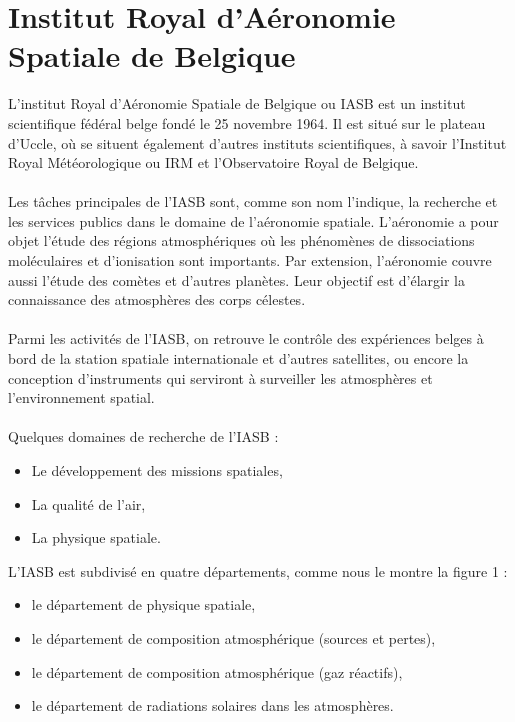 \documentclass[11pt]{article}
\begin{document}
\section{Institut Royal d'Aéronomie Spatiale de Belgique}
L'institut Royal d'Aéronomie Spatiale de Belgique ou IASB est un institut scientifique fédéral belge fondé le 25 novembre 1964.
Il est situé sur le plateau d'Uccle, où se situent également d'autres instituts scientifiques, à savoir l'Institut Royal Météorologique ou IRM et l'Observatoire Royal de Belgique.\\
\\
Les tâches principales de l'IASB sont, comme son nom l'indique, la recherche et les services publics dans le domaine de l'aéronomie spatiale.
L'aéronomie a pour objet l'étude des régions atmosphériques où les phénomènes de dissociations moléculaires et d'ionisation sont importants.
Par extension, l'aéronomie couvre aussi l'étude des comètes et d'autres planètes.
Leur objectif est d'élargir la connaissance des atmosphères des corps célestes.\\
\\
Parmi les activités de l'IASB, on retrouve le contrôle des expériences belges à bord de la station spatiale internationale et d'autres satellites, ou encore la conception d'instruments qui serviront à surveiller les atmosphères et l'environnement spatial.\\
\\
Quelques domaines de recherche de l'IASB :
\begin{itemize}[noitemsep]
    \item Le développement des missions spatiales,
    \item La qualité de l'air,
    \item La physique spatiale.
\end{itemize}
\vspace{10pt}
L'IASB est subdivisé en quatre départements, comme nous le montre la figure 1 :
\begin{itemize}[noitemsep]
    \item le département de physique spatiale,
    \item le département de composition atmosphérique (sources et pertes),
    \item le département de composition atmosphérique (gaz réactifs),
    \item le département de radiations solaires dans les atmosphères.
\end{itemize}
\vspace{3pt}
\end{document}

